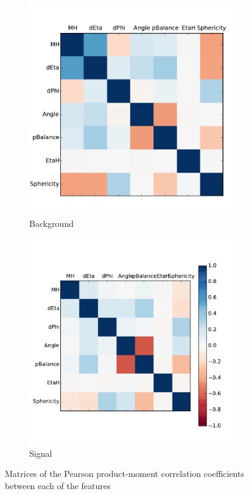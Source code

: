 \begin{figure}[htbp]
	\centering
	\begin{subfigure}[b]{0.395\textwidth}
		\includegraphics[width=\textwidth]{img/background_corr}
		\caption{Background}
		\label{fig:mh}
		\vspace{7mm}
	\end{subfigure}
	\begin{subfigure}[b]{0.5\textwidth}
		                \includegraphics[width=\textwidth]{img/signal_corr}
		                \caption{Signal}
		                \label{fig:mh}
		\end{subfigure}
	
	\caption{Matrices of the Pearson product-moment correlation coefficients between each of the features}
	\label{fig:cormat}
	\end{figure} 

